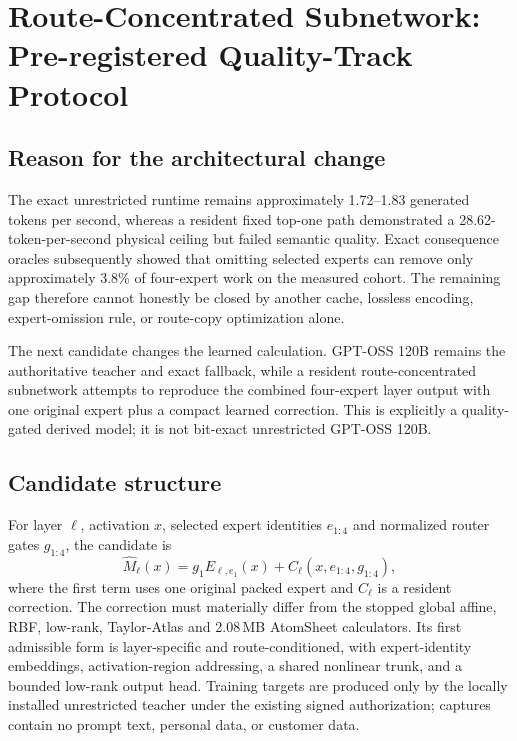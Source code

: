 \section{Route-Concentrated Subnetwork: Pre-registered Quality-Track Protocol}
\label{sec:gptoss120b-route-concentrated-protocol}

\subsection{Reason for the architectural change}

The exact unrestricted runtime remains approximately 1.72--1.83 generated
tokens per second, whereas a resident fixed top-one path demonstrated a
28.62-token-per-second physical ceiling but failed semantic quality.  Exact
consequence oracles subsequently showed that omitting selected experts can
remove only approximately 3.8\% of four-expert work on the measured cohort.
The remaining gap therefore cannot honestly be closed by another cache,
lossless encoding, expert-omission rule, or route-copy optimization alone.

The next candidate changes the learned calculation.  GPT-OSS 120B remains the
authoritative teacher and exact fallback, while a resident route-concentrated
subnetwork attempts to reproduce the combined four-expert layer output with
one original expert plus a compact learned correction.  This is explicitly a
quality-gated derived model; it is not bit-exact unrestricted GPT-OSS 120B.

\subsection{Candidate structure}

For layer $\ell$, activation $x$, selected expert identities $e_{1:4}$ and
normalized router gates $g_{1:4}$, the candidate is
\begin{equation}
 \widehat{M}_{\ell}(x)=g_1 E_{\ell,e_1}(x)+
 C_{\ell}\!\left(x,e_{1:4},g_{1:4}\right),
\end{equation}
where the first term uses one original packed expert and $C_{\ell}$ is a
resident correction.  The correction must materially differ from the stopped
global affine, RBF, low-rank, Taylor-Atlas and 2.08\,MB AtomSheet calculators.
Its first admissible form is layer-specific and route-conditioned, with
expert-identity embeddings, activation-region addressing, a shared nonlinear
trunk, and a bounded low-rank output head.  Training targets are produced only
by the locally installed unrestricted teacher under the existing signed
authorization; captures contain no prompt text, personal data, or customer
data.

